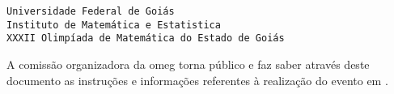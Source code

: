 \begin{center}
  \texttt{Universidade Federal de Goiás}                    \\
  \texttt{Instituto de Matemática e Estatistica}            \\
  \texttt{XXXII Olimpíada de Matemática do Estado de Goiás}
\end{center}

\vspace{24pt}

A comissão organizadora da \currentEdition{} \acrfull{omeg} torna público e faz
saber através deste documento as instruções e informações referentes à
realização do evento em \year.

\vspace{24pt}
